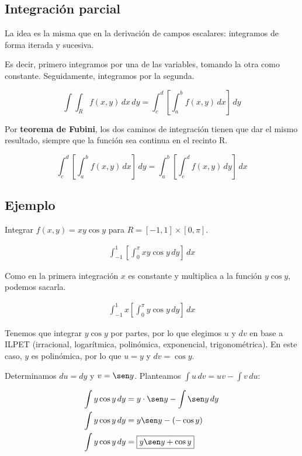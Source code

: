 \subsection{Integración parcial}

La idea es la misma que en la derivación de campos escalares:
integramos de forma iterada y sucesiva.

Es decir, 
primero integramos por una de las variables, 
tomando la otra como constante. 
Seguidamente, integramos por la segunda.

\begin{equation*}
    \int\int_R f(x,y) \,dx\,dy = \int_{c}^{d} \left[\int_{a}^{b} f(x,y) \,dx\right] \,dy
\end{equation*}

Por \textbf{teorema de Fubini},
los dos caminos de integración tienen que dar el mismo resultado,
siempre que la función sea continua en el recinto R.

\begin{equation*}
    \int_{c}^{d} \left[\int_{a}^{b} f(x,y) \,dx\right] \,dy = \int_{a}^{b} \left[\int_{c}^{d} f(x,y) \,dy\right] \,dx
\end{equation*}

\subsection{Ejemplo}

Integrar \(f(x,y) = xy\cos y\) para \(R = [-1,1] \times [0,\pi] \).

\begin{align*}
    \int_{-1}^{1} \left[\int_{0}^{\pi} xy\cos y \,dy\right] \,dx
\end{align*}

Como en la primera integración \(x\) es constante y multiplica a la función \(y\cos y\), podemos sacarla.

\begin{align*}
    \int_{-1}^{1} x \left[\int_{0}^{\pi} y\cos y \,dy\right] \,dx
\end{align*}

Tenemos que integrar \(y\cos y\) por partes, por lo que elegimos \(u\) y \(dv\) en base a ILPET (irracional, logarítmica, polinómica, exponencial, trigonométrica).
En este caso, \(y\) es polinómica, por lo que \(u = y\) y \(dv = \cos y\).

Determinamos \(du = dy\) y \(v = \sen y\). Planteamos \(\int u\,dv = uv - \int v \,du\):

\begin{align*}
    \int y\cos y \,dy & = y \cdot \sen y - \int \sen y \,dy \\
    \int y\cos y \,dy & = y \sen y - (-\cos y) \\
    \int y\cos y \,dy & = \boxed{y \sen y + \cos y}
\end{align*}

